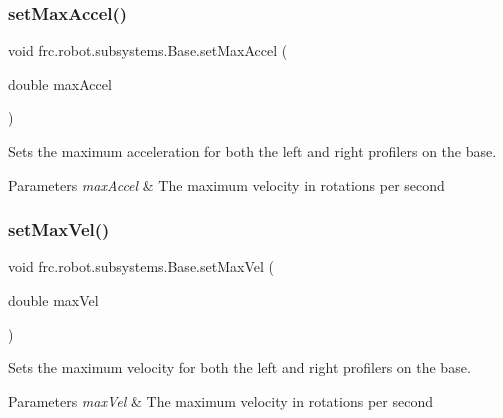 \subsubsection{\texorpdfstring{setMaxAccel()}{setMaxAccel()}}
{\footnotesize\ttfamily void frc.\+robot.\+subsystems.\+Base.\+set\+Max\+Accel (\begin{DoxyParamCaption}\item[{double}]{max\+Accel }\end{DoxyParamCaption})\hspace{0.3cm}{\ttfamily [inline]}}



Sets the maximum acceleration for both the left and right profilers on the base. 


\begin{DoxyParams}{Parameters}
{\em max\+Accel} & The maximum velocity in rotations per second \\
\hline
\end{DoxyParams}
\mbox{\label{classfrc_1_1robot_1_1subsystems_1_1_base_ac9dd3bd7c9b68b3f2d2986e2f2dad632}} 
\subsubsection{\texorpdfstring{setMaxVel()}{setMaxVel()}}
{\footnotesize\ttfamily void frc.\+robot.\+subsystems.\+Base.\+set\+Max\+Vel (\begin{DoxyParamCaption}\item[{double}]{max\+Vel }\end{DoxyParamCaption})\hspace{0.3cm}{\ttfamily [inline]}}



Sets the maximum velocity for both the left and right profilers on the base. 


\begin{DoxyParams}{Parameters}
{\em max\+Vel} & The maximum velocity in rotations per second \\
\hline
\end{DoxyParams}
\mbox{\label{classfrc_1_1robot_1_1subsystems_1_1_base_a6d1643d8fb0b7cf4fff02f46c0edbd42}} 
